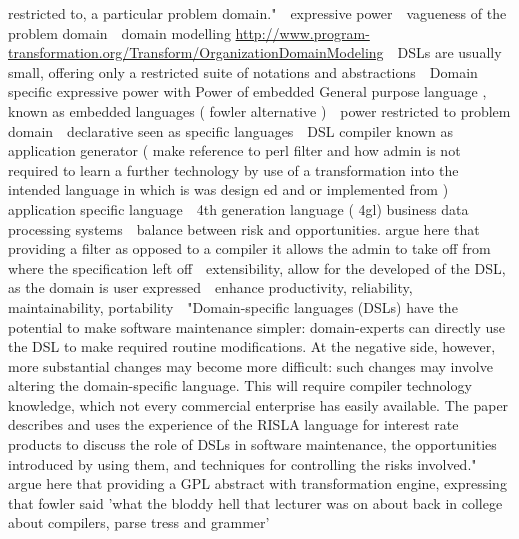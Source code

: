 restricted to, a particular problem domain."
\newline 
expressive power
\newline 
vagueness of the problem domain
\newline 
domain modelling
\url{http://www.program-transformation.org/Transform/OrganizationDomainModeling}
\newline 
DSLs are usually small, offering only a restricted suite of
notations and abstractions
\newline 
Domain specific expressive power with Power of embedded General purpose language , known as embedded languages ( fowler alternative )
\newline 
power restricted to problem domain
\newline 
declarative seen as specific languages
\newline 
DSL compiler known as application generator ( make reference to perl filter and how admin is not required to learn a further technology by use of a transformation into the intended language in which is was design ed and or implemented from )
\newline 
application specific language
\newline 
4th generation language ( 4gl) business data processing systems
\newline 
balance between risk and opportunities. 
argue here that providing a filter as opposed to a compiler it allows the admin to take off from where the specification left off
\newline 
extensibility, allow for the developed of the DSL, as the domain is user expressed
\newline 
enhance productivity, reliability, maintainability, portability
\newline 
"Domain-specific languages (DSLs) have the potential
to make software maintenance simpler: domain-experts
can directly use the DSL to make required routine modifications.
At the negative side, however, more substantial
changes may become more difficult: such changes
may involve altering the domain-specific language. This
will require compiler technology knowledge, which not
every commercial enterprise has easily available. The
paper describes and uses the experience of the RISLA
language for interest rate products to discuss the role of
DSLs in software maintenance, the opportunities introduced
by using them, and techniques for controlling the
risks involved."
\newline 
argue here that providing a GPL abstract with  transformation engine, expressing that fowler said 'what the bloddy hell that lecturer was on about back in college about compilers, parse tress and grammer' %
